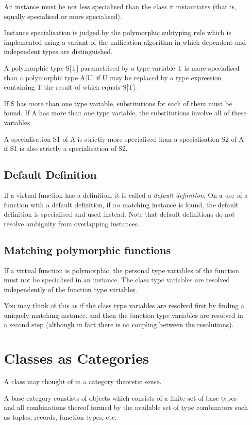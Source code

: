 \documentclass[oneside]{book}
\begin{document}
An instance must be not less specialised than the class
it instantiates (that is, equally specialised or more specialised).

Instance specialisation is judged by the polymorphic subtyping
rule which is implemented using a variant of the
unification algorithm in which dependent and independent types
are distinguished.

A polymorphic type S[T] parametrised by a type variable T is more
specialised than a polymorphic type A[U] if U may be
replaced by a type expression containing T the result of which
equals S[T].

If S has more than one type variable, substitutions for each
of them must be found. If A has more than one type variable,
the substitutions involve all of these variables.

A specialisation S1 of A is strictly more specialised than a specialisation
S2 of A if S1 is also strictly a specialisation of S2.

\subsection{Default Definition}
If a virtual function has a definition, it is called
a {\em default definition}. On a use of a function with
a default definition, if no matching instance is found, 
the default definition is specialised and used instead.
Note that default definitions do not resolve ambiguity
from overlapping instances.

\subsection{Matching polymorphic functions}
If a virtual function is polymorphic, the personal
type variables of the function must not be specialised
in an instance. The class type variables are resolved
independently of the function type variables.

You may think of this as if the class type variables
are resolved first by finding a uniquely matching
instance, and then the function type variables are
resolved in a second step (although in fact there
is no coupling between the resolutions).

\section{Classes as Categories}
A class may thought of in a category theoretic sense.

A base category constists of objects which consists of a 
finite set of base types and all combinations thereof formed
by the available set of type combinators such as tuples,
records, function types, etc. 
\end{document}
